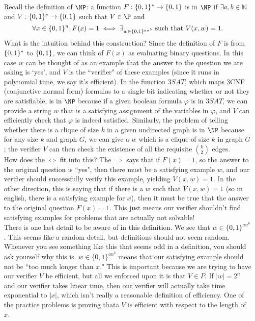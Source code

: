 \documentclass[10pt]{article}
\newcommand{\TSAT}{3\mathit{SAT}}
\begin{document}
Recall the definition of $\NP$: a function $F:\{0,1\}^*\to\{0,1\}$ is in $\NP$ if $\exists a,b\in\mathbb{N}$ and $V:\{0,1\}^*\to\{0,1\}$ such that $V\in\P$ and
\[\forall x\in\{0,1\}^n, F(x)=1\iff\exists_{w\in\{0,1\}^{an^b}}\text{ such that }V(x,w)=1.\]
What is the intuition behind this construction? Since the definition of $F$ is from $\{0,1\}^*$ to $\{0,1\}$, we can think of $F(x)$ as evaluating binary questions. In this case $w$ can be thought of as an example that the answer to the question we are asking is `yes', and $V$ is the ``verifier" of these examples (since it runs in polynomial time, we say it's efficient). In the function $\TSAT$, which maps 3CNF (conjunctive normal form) formulas to a single bit indicating whether or not they are satisfiable, is in $\NP$ because if a given boolean formula $\varphi$ is in $\TSAT$, we can provide a string $w$ that is a satisfying assignment of the variables in $\varphi$, and $V$ can efficiently check that $\varphi$ is indeed satisfied. Similarly, the problem of telling whether there is a clique of size $k$ in a given undirected graph is in $\NP$ because for any size $k$ and graph $G$, we can give a $w$ which is a clique of size $k$ in graph $G$; the verifier $V$ can then check the existence of all the requisite $\binom k2$ edges.\\

How does the $\Leftrightarrow$ fit into this? The $\Rightarrow$ says that if $F(x)=1$, so the answer to the original question is ``yes", then there must be a satisfying example $w$, and our verifier should successfully verify this example, yielding $V(x,w)=1$. In the other direction, this is saying that if there is a $w$ such that $V(x,w)=1$ (so in english, there is a satisfying example for $x$), then it must be true that the answer to the original question $F(x)=1$. This just means our verifier shouldn't find satisfying examples for problems that are actually not solvable!\\

There is one last detail to be aware of in this definition. We see that $w\in \{0,1\}^{an^b}$. This seems like a random detail, but definitions should not seem random. Whenever you see something like this that seems odd in a definition, you should ask yourself why this is. $w\in \{0,1\}^{an^b}$ means that our satisfying example should not be ``too much longer than $x$." This is important because we are trying to have our verifier $V$ be efficient, but all we enforced upon it is that $V\in P$. If $|w| = 2^n$ and our verifier takes linear time, then our verifier will actually take time exponential to $|x|$, which isn't really a reasonable definition of efficiency. One of the practice problems is proving thata $V$ is efficient with respect to the length of $x$.
\end{document}
